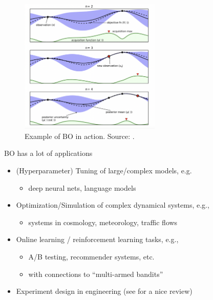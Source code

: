 \documentclass[aspectratio=169]{beamer}					%
\begin{document}
\begin{frame}[plain]
	\begin{figure}
		\centering
		\includegraphics[width = 0.6\textwidth]{figures/BO-example.png}
		\caption{Example of BO in action. Source: \cite{shahriari2015taking}.}
	\end{figure}
	
	
\end{frame}

\begin{frame}{BO has a lot of applications}
	\begin{itemize}
		\item (Hyperparameter) Tuning of large/complex models, e.g.
		\begin{itemize}
			\item deep neural nets,  language models
		\end{itemize}
	\item Optimization/Simulation of complex dynamical systems, e.g., 
		\begin{itemize}
			\item systems in cosmology, meteorology, traffic flows
		\end{itemize}
	\item Online learning / reinforcement learning tasks, e.g., 
	\begin{itemize}
		\item A/B testing, recommender systems, etc.
		\item with connections to ``multi-armed bandits''
	\end{itemize}
	\item Experiment design in engineering (see \cite{greenhill2020bayesian} for a nice review)
	\end{itemize}
\end{frame}
\end{document}
